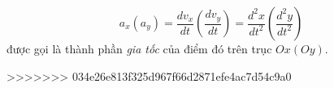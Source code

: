     \begin{definition}
        \begin{equation}
            a_{x}(a_y)=\frac{dv_x}{dt}\left(\frac{dv_y}{dt}\right)=\frac{d^2x}{dt^2}\left(\frac{d^2y}{dt^2}\right)
        \end{equation}
    được gọi là thành phần \emph{gia tốc} của điểm đó trên trục $Ox(Oy)$.
    \end{definition}
    
>>>>>>> 034e26e813f325d967f66d2871efe4ac7d54c9a0

